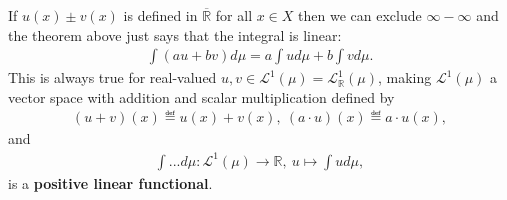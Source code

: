 \begin{remark}
    If \(u(x) \pm v(x)\) is defined in \(\overline{\mathbb{R}}\) for all \(x\in X\) then we can exclude \(\infty - \infty\) and the theorem above just says that 
    the integral is linear:
    \begin{align*}
        \int (au + bv)d\mu = a\int ud\mu + b\int vd\mu.
    \end{align*}
    This is always true for real-valued \(u,v\in\mathcal{L}^{1}(\mu) = \mathcal{L}^{1}_{\mathbb{R}}(\mu)\), making \(\mathcal{L}^{1}(\mu)\) a vector space with 
    addition and scalar multiplication defined by
    \begin{align*}
        (u + v)(x) \eqdef u(x) + v(x), \ (a\cdot u)(x) \eqdef a\cdot u(x),
    \end{align*}
    and
    \begin{align*}
        \int ... d\mu: \mathcal{L}^{1}(\mu) \rightarrow \mathbb{R}, \ u \mapsto \int ud\mu,
    \end{align*}
    is a \textbf{positive linear functional}.
\end{remark}

